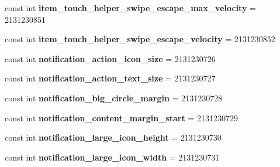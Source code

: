 \begin{DoxyCompactItemize}
\item 
\mbox{\label{classst_delivery_1_1_resource_1_1_dimension_a964df168a78f4d7e5fa990b0012fce35}} 
const int {\bfseries item\+\_\+touch\+\_\+helper\+\_\+swipe\+\_\+escape\+\_\+max\+\_\+velocity} = 2131230851
\item 
\mbox{\label{classst_delivery_1_1_resource_1_1_dimension_a71b89d7b0e6f4c19f0bed723a9afea98}} 
const int {\bfseries item\+\_\+touch\+\_\+helper\+\_\+swipe\+\_\+escape\+\_\+velocity} = 2131230852
\item 
\mbox{\label{classst_delivery_1_1_resource_1_1_dimension_a28f8df1b50c1a5dd1add34214088b429}} 
const int {\bfseries notification\+\_\+action\+\_\+icon\+\_\+size} = 2131230726
\item 
\mbox{\label{classst_delivery_1_1_resource_1_1_dimension_ac0f0a2db29c810073e9dbf0131f057a5}} 
const int {\bfseries notification\+\_\+action\+\_\+text\+\_\+size} = 2131230727
\item 
\mbox{\label{classst_delivery_1_1_resource_1_1_dimension_a8508d86433caf282b6f92900c3447a7a}} 
const int {\bfseries notification\+\_\+big\+\_\+circle\+\_\+margin} = 2131230728
\item 
\mbox{\label{classst_delivery_1_1_resource_1_1_dimension_a3fc5b9c7c71462a2f9ede783dde28026}} 
const int {\bfseries notification\+\_\+content\+\_\+margin\+\_\+start} = 2131230729
\item 
\mbox{\label{classst_delivery_1_1_resource_1_1_dimension_a825b365aea2193a9cce149b6ebddcff2}} 
const int {\bfseries notification\+\_\+large\+\_\+icon\+\_\+height} = 2131230730
\item 
\mbox{\label{classst_delivery_1_1_resource_1_1_dimension_af1aafa1425d01042bcdacef886876d03}} 
const int {\bfseries notification\+\_\+large\+\_\+icon\+\_\+width} = 2131230731
\item 
\mbox{\label{classst_delivery_1_1_resource_1_1_dimension_ac84ce7c47e1ac9fafc573264355aadf9}} 

\end{DoxyCompactItemize}

